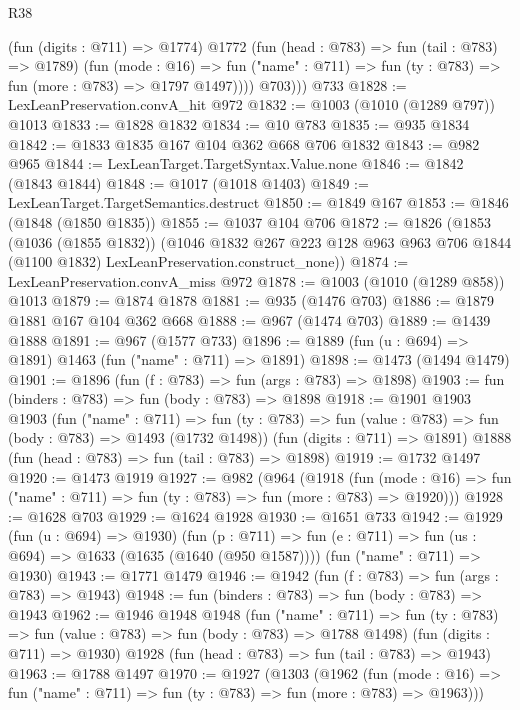 \begin{lexlean}{R38}
\begin{coremodule}
              (fun (digits : @711) => @1774)
              @1772
              (fun (head : @783) => fun (tail : @783) => @1789)
              (fun (mode : @16) =>
              fun ("name" : @711) => fun (ty : @783) => fun (more : @783) => @1797 @1497))))
          @703)))
    @733
@1828 := LexLeanPreservation.convA_hit @972
@1832 := @1003 (@1010 (@1289 @797)) @1013
@1833 := @1828 @1832
@1834 := @10 @783
@1835 := @935 @1834
@1842 := @1833 @1835 @167 @104 @362 @668 @706 @1832
@1843 := @982 @965
@1844 := LexLeanTarget.TargetSyntax.Value.none
@1846 := @1842 (@1843 @1844)
@1848 := @1017 (@1018 @1403)
@1849 := LexLeanTarget.TargetSemantics.destruct
@1850 := @1849 @167
@1853 := @1846 (@1848 (@1850 @1835))
@1855 := @1037 @104 @706
@1872 := @1826
    (@1853
      (@1036 (@1855 @1832))
      (@1046
        @1832
        @267
        @223
        @128
        @963
        @963
        @706
        @1844
        (@1100 @1832)
        LexLeanPreservation.construct_none))
@1874 := LexLeanPreservation.convA_miss @972
@1878 := @1003 (@1010 (@1289 @858)) @1013
@1879 := @1874 @1878
@1881 := @935 (@1476 @703)
@1886 := @1879 @1881 @167 @104 @362 @668
@1888 := @967 (@1474 @703)
@1889 := @1439 @1888
@1891 := @967 (@1577 @733)
@1896 := @1889 (fun (u : @694) => @1891) @1463 (fun ("name" : @711) => @1891)
@1898 := @1473 (@1494 @1479)
@1901 := @1896 (fun (f : @783) => fun (args : @783) => @1898)
@1903 := fun (binders : @783) => fun (body : @783) => @1898
@1918 := @1901
    @1903
    @1903
    (fun ("name" : @711) =>
    fun (ty : @783) => fun (value : @783) => fun (body : @783) => @1493 (@1732 @1498))
    (fun (digits : @711) => @1891)
    @1888
    (fun (head : @783) => fun (tail : @783) => @1898)
@1919 := @1732 @1497
@1920 := @1473 @1919
@1927 := @982
    (@964
      (@1918
        (fun (mode : @16) => fun ("name" : @711) => fun (ty : @783) => fun (more : @783) => @1920)))
@1928 := @1628 @703
@1929 := @1624 @1928
@1930 := @1651 @733
@1942 := @1929
    (fun (u : @694) => @1930)
    (fun (p : @711) => fun (e : @711) => fun (us : @694) => @1633 (@1635 (@1640 (@950 @1587))))
    (fun ("name" : @711) => @1930)
@1943 := @1771 @1479
@1946 := @1942 (fun (f : @783) => fun (args : @783) => @1943)
@1948 := fun (binders : @783) => fun (body : @783) => @1943
@1962 := @1946
    @1948
    @1948
    (fun ("name" : @711) =>
    fun (ty : @783) => fun (value : @783) => fun (body : @783) => @1788 @1498)
    (fun (digits : @711) => @1930)
    @1928
    (fun (head : @783) => fun (tail : @783) => @1943)
@1963 := @1788 @1497
@1970 := @1927
    (@1303
      (@1962
        (fun (mode : @16) => fun ("name" : @711) => fun (ty : @783) => fun (more : @783) => @1963)))

\end{coremodule}
\end{lexlean}
